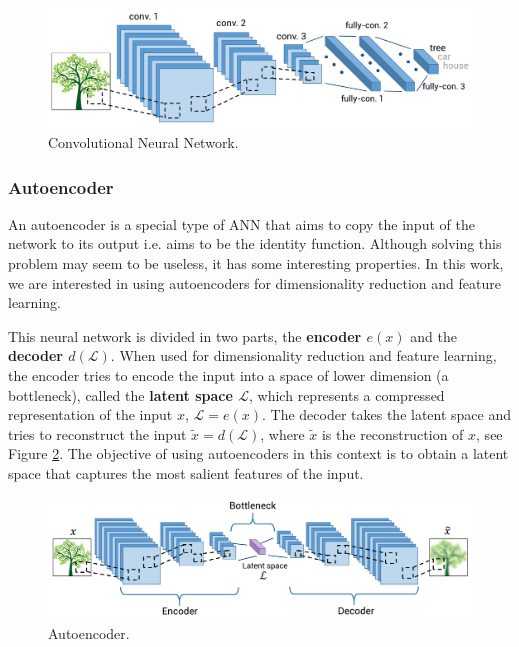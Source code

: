 \begin{figure}[H]
\centering
\includegraphics[width=\linewidth]{imagenes/cap1/cnn.pdf}
\caption{Convolutional Neural Network.}
\label{fig:cnn}
\end{figure}

\subsubsection{Autoencoder}
    
An autoencoder is a special type of ANN that aims to copy the input of the network to its output i.e. aims to be the identity function. Although solving this problem may seem to be useless, it has some interesting properties. In this work, we are interested in using autoencoders for dimensionality reduction and feature learning. 

This neural network is divided in two parts, the \textbf{encoder $e(x)$} and the \textbf{decoder $d(\mathcal{L})$}. When used for dimensionality reduction and feature learning, the encoder tries to encode the input into a space of lower dimension (a bottleneck), called the \textbf{latent space $\mathcal{L}$}, which represents a compressed representation of the input $x$, $\mathcal{L}=e(x)$. The decoder takes the latent space and tries to reconstruct the input $\widetilde x = d(\mathcal{L})$, where $\widetilde x$ is the reconstruction of $x$, see Figure \ref{fig:ae}. The objective of using autoencoders in this context is to obtain a latent space that captures the most salient features of the input. 
    
\begin{figure}[H]
    \centering
    \includegraphics[width=\linewidth]{imagenes/cap1/ae.pdf}
    \caption{Autoencoder.}
    \label{fig:ae}
\end{figure}
    
